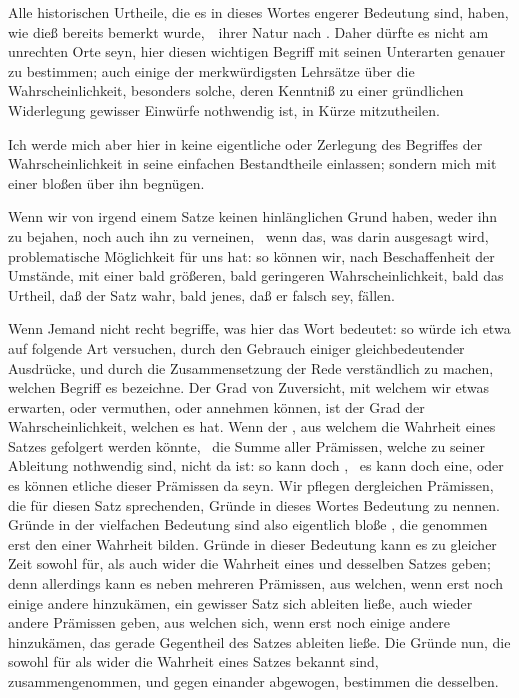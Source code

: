 \begin{aufza}
\item Alle historischen Urtheile, die es in dieses Wortes engerer Bedeutung sind, haben, wie dieß bereits bemerkt wurde,~\ ihrer Natur nach . Daher dürfte es nicht am unrechten Orte seyn, hier diesen wichtigen Begriff mit seinen Unterarten genauer zu bestimmen; auch einige der merkwürdigsten Lehrsätze über die Wahrscheinlichkeit, besonders solche, deren Kenntniß zu einer gründlichen Widerlegung gewisser Einwürfe nothwendig ist, in Kürze mitzutheilen.
\item Ich werde mich aber hier in keine eigentliche  oder Zerlegung des Begriffes der Wahrscheinlichkeit in seine einfachen Bestandtheile einlassen; sondern mich mit einer bloßen  über ihn begnügen.
\item Wenn wir von irgend einem Satze keinen hinlänglichen Grund haben, weder ihn zu bejahen, noch auch ihn zu verneinen, \dh\ wenn das, was darin ausgesagt wird, problematische Möglichkeit für uns hat: so können wir, nach Beschaffenheit der Umstände, mit einer bald größeren, bald geringeren Wahrscheinlichkeit, bald das Urtheil, daß der Satz wahr, bald jenes, daß er falsch sey, fällen.
\item Wenn Jemand nicht recht begriffe, was hier das Wort  bedeutet: so würde ich etwa auf folgende Art versuchen, durch den Gebrauch einiger gleichbedeutender Ausdrücke, und durch die Zusammensetzung der Rede verständlich zu machen, welchen Begriff es bezeichne. Der Grad von Zuversicht, mit welchem wir etwas erwarten, oder vermuthen, oder annehmen können, ist der Grad der Wahrscheinlichkeit, welchen es hat. Wenn der , aus welchem die Wahrheit eines Satzes gefolgert werden könnte, \dh\ die Summe aller Prämissen, welche zu seiner Ableitung nothwendig sind, nicht da ist: so kann doch , \dh\ es kann doch eine, oder es können etliche dieser Prämissen da seyn. Wir pflegen dergleichen Prämissen, die für diesen Satz sprechenden, Gründe in dieses Wortes  Bedeutung zu nennen. Gründe in der vielfachen Bedeutung sind also eigentlich bloße , die  genommen erst den  einer Wahrheit bilden. Gründe in dieser Bedeutung kann es zu gleicher Zeit sowohl für, als auch wider die Wahrheit eines und desselben Satzes geben; denn allerdings kann es neben mehreren Prämissen, aus welchen, wenn erst noch einige andere hinzukämen, ein gewisser Satz sich ableiten ließe, auch wieder andere Prämissen geben, aus welchen sich, wenn erst noch einige andere hinzukämen, das gerade Gegentheil des Satzes ableiten ließe. Die Gründe nun, die sowohl für als wider die Wahrheit eines Satzes bekannt sind, zusammengenommen, und gegen einander abgewogen, bestimmen die  desselben.

\end{aufza}
